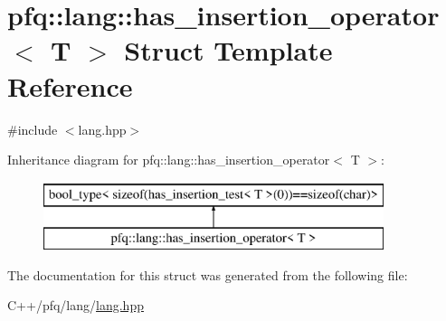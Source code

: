 \hypertarget{structpfq_1_1lang_1_1has__insertion__operator}{\section{pfq\+:\+:lang\+:\+:has\+\_\+insertion\+\_\+operator$<$ T $>$ Struct Template Reference}
\label{structpfq_1_1lang_1_1has__insertion__operator}
}


{\ttfamily \#include $<$lang.\+hpp$>$}

Inheritance diagram for pfq\+:\+:lang\+:\+:has\+\_\+insertion\+\_\+operator$<$ T $>$\+:\begin{figure}[H]
\begin{center}
\leavevmode
\includegraphics[height=2.000000cm]{structpfq_1_1lang_1_1has__insertion__operator}
\end{center}
\end{figure}


The documentation for this struct was generated from the following file\+:\begin{DoxyCompactItemize}
\item 
C++/pfq/lang/\hyperlink{lang_8hpp}{lang.\+hpp}\end{DoxyCompactItemize}
